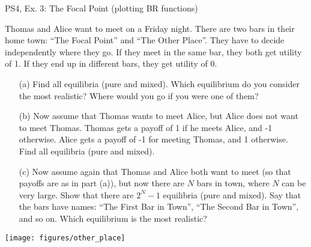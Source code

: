 



\begin{frame}{PS4, Ex. 3: The Focal Point (plotting BR functions)}
  \begin{multicols}{2}
    Thomas and Alice want to meet on a Friday night. There are two bars in their home town: “The Focal Point” and “The Other Place”. They have to decide independently where they go. If they meet in the same bar, they both get utility of 1. If they end up in different bars, they get utility of 0.
    \begin{itemize}
      \item[(a)] Find all equilibria (pure and mixed). Which equilibrium do you consider the most realistic? Where would you go if you were one of them?
      \item[(b)] Now assume that Thomas wants to meet Alice, but Alice does not want to meet Thomas. Thomas gets a payoff of 1 if he meets Alice, and -1 otherwise. Alice gets a payoff of -1 for meeting Thomas, and 1 otherwise. Find all equilibria (pure and mixed).
    \end{itemize}
  \vfill\null \columnbreak
  \begin{itemize}
    \item[(c)] Now assume again that Thomas and Alice both want to meet (so that payoffs are as in part (a)), but now there are $N$ bars in town, where $N$ can be very large. Show that there are $2^N-1$ equilibria (pure and mixed). Say that the bars have names: “The First Bar in Town”, “The Second Bar in Town”, and so on. Which equilibrium is the most realistic?
  \end{itemize}
  \texttt{[image: figures/other\_place]}
  \vfill\null
  \end{multicols}
\end{frame}

